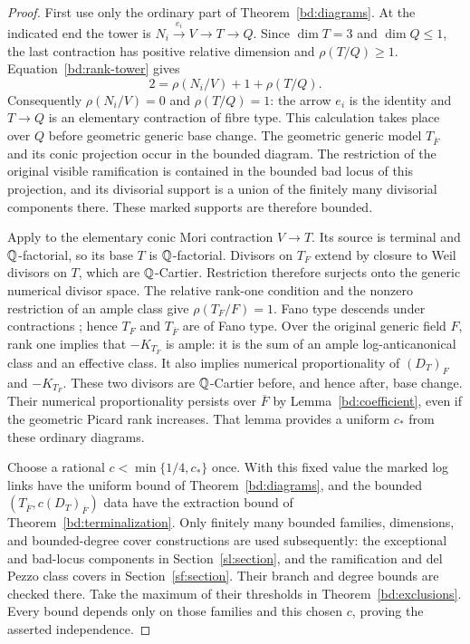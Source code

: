 \begin{proof}
First use only the ordinary part of
Theorem~\ref{bd:diagrams}. At the indicated end the tower is
$N_i\xrightarrow{e_i}V\to T\to Q$. Since $\dim T=3$ and
$\dim Q\leq1$, the last contraction has positive relative
dimension and $\rho(T/Q)\geq1$. Equation~\eqref{bd:rank-tower} gives
\[
 2=\rho(N_i/V)+1+\rho(T/Q).
\]
Consequently $\rho(N_i/V)=0$ and $\rho(T/Q)=1$: the arrow $e_i$
is the identity and $T\to Q$ is an elementary contraction of fibre
type. This calculation takes place over $Q$ before geometric
generic base change.
The geometric generic model $T_{\overline F}$ and its conic
projection occur in the bounded diagram. The restriction of the
original visible ramification is contained in the
bounded bad locus of this projection, and its divisorial
support is a union of the finitely many divisorial
components there.  These marked supports are therefore
bounded.

Apply \cite[Lemma~4.6]{Druel16} to the elementary conic Mori
contraction $V\to T$. Its source is terminal and $\mathbb Q$-factorial,
so its base $T$ is $\mathbb Q$-factorial.
Divisors on $T_F$ extend by closure to Weil divisors on $T$,
which are $\mathbb Q$-Cartier. Restriction therefore surjects onto the
generic numerical divisor space. The relative rank-one condition
and the nonzero restriction of an ample class give $\rho(T_F/F)=1$.
Fano type descends under contractions
\cite[Lemma~2.8]{ProkhorovShokurov09}; hence $T_F$ and
$T_{\overline F}$ are of Fano type. Over the original generic field
$F$, rank one implies that $-K_{T_F}$ is ample: it is the sum of
an ample log-anticanonical class and an effective class.
It also implies numerical proportionality of $(D_T)_F$ and
$-K_{T_F}$. These two divisors are $\mathbb Q$-Cartier before, and
hence after, base change. Their numerical proportionality persists
over $\overline F$ by Lemma~\ref{bd:coefficient}, even if the
geometric Picard rank increases. That lemma
provides a uniform $c_*$ from these ordinary diagrams.

Choose a rational $c<\min\{1/4,c_*\}$ once.  With this
fixed value the marked log links have the uniform bound
of Theorem~\ref{bd:diagrams}, and the bounded
$(T_{\overline F},c(D_T)_{\overline F})$ data have the extraction bound of
Theorem~\ref{bd:terminalization}.  Only finitely
many bounded families, dimensions, and bounded-degree
cover constructions are used subsequently: the exceptional and
bad-locus components in Section~\ref{sl:section}, and the
ramification and del Pezzo class covers in Section~\ref{sf:section}.
Their branch and degree bounds are checked there. Take the
maximum of their thresholds in
Theorem~\ref{bd:exclusions}.  Every bound depends
only on those families and this chosen $c$, proving
the asserted independence.
\end{proof}
